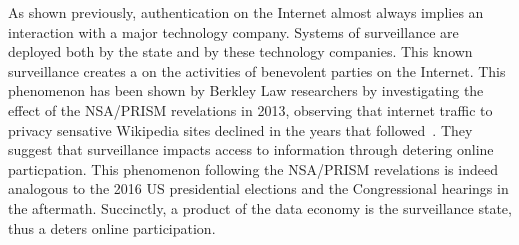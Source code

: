 As shown previously, authentication on the Internet almost always implies an interaction
with a major technology company. Systems of surveillance are deployed both by the state
and by these technology companies. This known surveillance creates a \ce on the
activities of benevolent parties on the Internet. This phenomenon has been shown
by Berkley Law researchers by investigating the effect of the NSA/PRISM revelations
in 2013, observing that internet traffic to privacy sensative Wikipedia sites
declined in the years that followed~\cite{penney2016chilling}. They suggest
that surveillance impacts access to information through detering online particpation.
This phenomenon following the NSA/PRISM revelations is indeed analogous to the
2016 US presidential elections and the Congressional hearings in the aftermath.
Succinctly, a product of the data economy is the surveillance state, thus a \ce
deters online participation.


%
%
%
